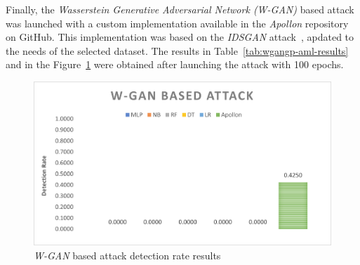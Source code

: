 Finally, the \textit{Wasserstein Generative Adversarial Network (W-GAN)} based attack was launched with a custom implementation
available in the \textit{Apollon} repository on GitHub.
This implementation was based on the \textit{IDSGAN} attack~\cite{lin2022idsgan}, apdated to the needs of the selected dataset.
The results in Table~\ref{tab:wgangp-aml-results} and in the Figure~\ref{fig:wgangp-aml-results} were obtained after
launching the attack with 100 epochs.

\begin{table}
    \centering
    \caption{Results of the \textit{W-GAN} based AML attack}
    \label{tab:wgangp-aml-results}
\end{table}

\begin{figure}
    \centering
    \includegraphics[width=0.9\columnwidth]{WGAN.png}
    \caption{\textit{W-GAN} based attack detection rate results}
    \label{fig:wgangp-aml-results}
\end{figure}

